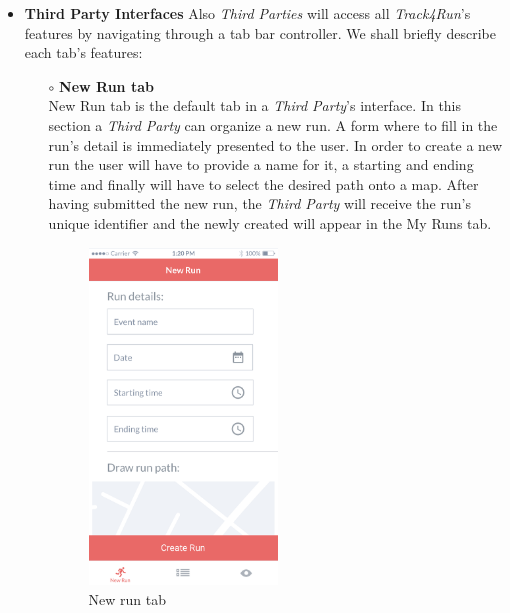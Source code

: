 \documentclass[titlepage]{article}
\begin{document}
\begin{itemize}
\begin{itemize}
				\item{\bf Third Party Interfaces} 
			Also {\it Third Parties} will access all {\it Track4Run}’s features by navigating through a tab bar controller. We shall briefly describe each tab’s features:
				\begin{itemize}
					\item[$\circ$] {\bf New Run tab} \\
					New Run tab is the default tab in a {\it Third Party}’s interface. In this section a {\it Third Party} can organize a new run. A form where to fill in the run’s detail is immediately presented to the user. In order to create a new run the user will have to provide a name for it, a starting and ending time and finally will have to select the desired path onto a map. After having submitted the new run, the {\it Third Party} will receive the run’s unique identifier and the newly created will appear in the My Runs tab.\\
					\begin{figure}[H]
						\center
  						\includegraphics[width=5cm]{Mockup/mockupNewRun.png}
  						\caption{New run tab}
 					 	\label{fig:NewRun}
					\end{figure}


\end{itemize}
\end{itemize}
\end{itemize}
\end{document}
